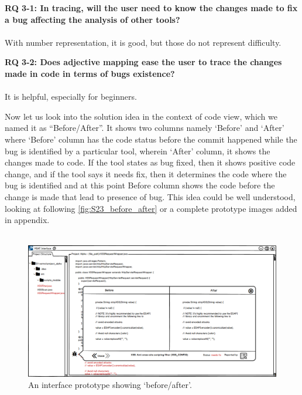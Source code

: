 \begin{myboxi}{{\textbf{RQ 3-1: In tracing, will the user need to know the changes made to fix a bug affecting the analysis of other tools?}}}
\\ \\ With number representation, it is good, but those do not represent difficulty.
\end{myboxi}

\begin{myboxi} {{\textbf{RQ 3-2: Does adjective mapping ease the user to trace the changes made in code in terms of bugs existence?}}}
\\ \\ It is helpful, especially for beginners.
\end{myboxi}
	
Now let us look into the solution idea in the context of code view, which we named it as “Before/After”. It shows two columns namely ‘Before’ and ‘After’ where ‘Before’ column has the code status before the commit happened while the bug is identified by a particular tool, wherein ‘After’ column, it shows the changes made to code. If the tool states as bug fixed, then it shows positive code change, and if the tool says it needs fix, then it determines the code where the bug is identified and at this point Before column shows the code before the change is made that lead to presence of bug. This idea could be well understood, looking at following \autoref{fig:S23_before_after} or a complete prototype images added in appendix. \\ \\


\begin{figure}[hbt!]
	\centering
	\includegraphics[width=\linewidth]{figures/solution_ideas_snaps/S23_before_after}
	\caption{An interface prototype showing ‘before/after’.}
	\label{fig:S23_before_after}
\end{figure}

